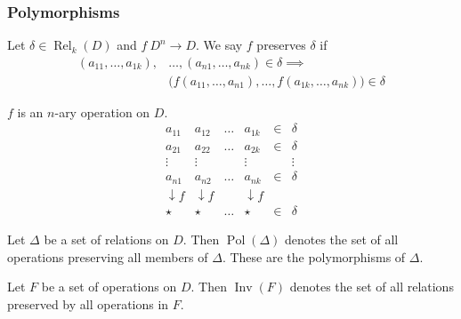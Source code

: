 \documentclass[12pt,xcolor=dvipsnames,handout
   ]{beamer}
\DeclareMathOperator{\Rel}{Rel}
\newcommand{\bigpause}{\pause\bigskip}
\DeclareMathOperator{\Pol}{Pol}
\DeclareMathOperator{\Inv}{Inv}
\renewcommand{\.}{\cdot}
\let\emph=\alert
\begin{document}
\begin{frame}
  \frametitle{Polymorphisms}

  \begin{definition}
    Let $\delta \in \Rel_k(D)$ and $f\: D^n \to D$. We say 
    \emph{$f$ preserves $\delta$} if
    \begin{equation*}
      \begin{split}
        (a_{11}, \dots, a_{1k}),&\dots, (a_{n1},\dots, a_{nk}) \in
        \delta \implies\\ 
        &\bigl( f(a_{11},\dots, a_{n1}), \dots, f(a_{1k},\dots,a_{nk})
        \bigr) \in \delta
    \end{split}
    \end{equation*}

  \end{definition}

  \begin{overprint}
  $f$ is an \emph{$n$-ary operation} on $D$.
    \begin{equation*}
      \newcommand\flab{\scriptstyle{f}}
      \begin{matrix} a_{11} & a_{12} & \dots & a_{1k} & \in & \delta \\
        a_{21} & a_{22} & \dots & a_{2k} & \in & \delta \\
        \vdots  & \vdots &       &\vdots  &     & \vdots \\
        a_{n1} & a_{n2} & \dots & a_{nk} & \in & \delta \\
        \downarrow\flab &\downarrow\flab &  & \downarrow\flab \\
        \star  & \star  & \dots & \star  & \in & \delta
      \end{matrix}
    \end{equation*}
  \end{overprint}
\end{frame}

\begin{frame}
  \begin{definition}
    Let $\Delta$ be a set of relations on $D$. Then
    \emph{$\Pol(\Delta)$} denotes the set of all operations preserving
    all members of $\Delta$. These are the \emph{polymorphisms} of
    $\Delta$. 

    \bigpause

    Let $F$ be a set of operations on $D$. Then \emph{$\Inv(F)$} denotes
    the set of all relations preserved by all operations in $F$.
  \end{definition}
\end{frame}
\end{document}
